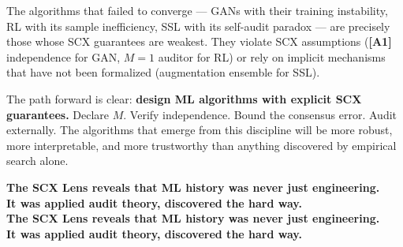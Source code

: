 \documentclass[12pt,a4paper]{article}
\theoremstyle{definition}
\newcommand{\SCX}{\textsc{SCX}}
\newcommand{\asmTag}[1]{\textsf{\textbf{[A#1]}}}
\begin{document}
The algorithms that failed to converge — GANs with their training instability, RL with its sample inefficiency, SSL with its self-audit paradox — are precisely those whose \SCX{} guarantees are weakest. They violate \SCX{} assumptions (\asmTag{1} independence for GAN, $M=1$ auditor for RL) or rely on implicit mechanisms that have not been formalized (augmentation ensemble for SSL).

The path forward is clear: \textbf{design ML algorithms with explicit \SCX{} guarantees.} Declare $M$. Verify independence. Bound the consensus error. Audit externally. The algorithms that emerge from this discipline will be more robust, more interpretable, and more trustworthy than anything discovered by empirical search alone.

\begin{center}
\large\bfseries
The SCX Lens reveals that ML history was never just engineering.\\
It was applied audit theory, discovered the hard way.\\
The SCX Lens reveals that ML history was never just engineering.\\
It was applied audit theory, discovered the hard way.
\end{center}
\end{document}
